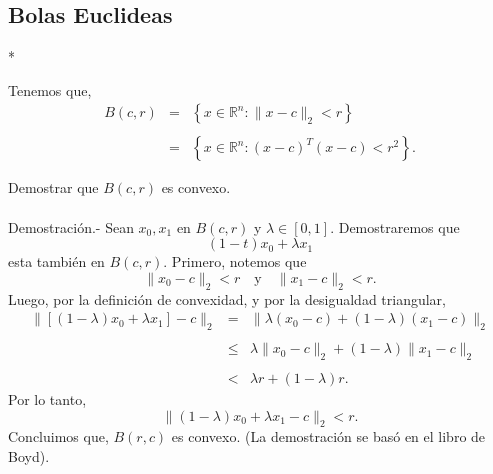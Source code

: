 \begin{paracol}{2}
\section{Bolas Euclideas}

\switchcolumn[1]*{\scriptsize
\begin{center}
\end{center}
}
\switchcolumn[0]\noindent
Tenemos que,
$$
\begin{array}{rcl}
    B(c,r)&=&\left\{x\in \mathbb{R}^n : \|x-c\|_2<r\right\}\\\\
	  &=& \left\{x\in \mathbb{R}^n : (x-c)^T(x-c)<r^2\right\}.
\end{array}
$$

{\color{blue}
\begin{ejer}
    Demostrar que $B(c,r)$ es convexo.\\\\
	Demostración.-\; Sean $x_0,x_1$ en $B(c,r)$ y $\lambda\in[0,1]$. Demostraremos que 
	$$(1-t)x_0+\lambda x_1$$
	esta también en $B(c,r)$. Primero, notemos que 
	$$\|x_0-c\|_2<r \quad \text{y}\quad \|x_1-c\|_2<r.$$
	Luego, por la definición de convexidad, y por la desigualdad triangular,
	$$
	\begin{array}{rcl}
	    \|\left[(1-\lambda)x_0+\lambda x_1\right]-c\|_2&=&\|\lambda(x_0-c)+(1-\lambda)(x_1-c)\|_2\\\\
					      &\leq& \lambda\|x_0-c\|_2+(1-\lambda)\|x_1-c\|_2\\\\
					      &<& \lambda r+(1-\lambda)r.
	\end{array}
	$$
	Por lo tanto,
	$$\|(1-\lambda)x_0+\lambda x_1-c\|_2<r.$$
	Concluimos que, $B(r,c)$ es convexo. (La demostración se basó en el libro de Boyd).
\end{ejer}
}


\end{paracol}
